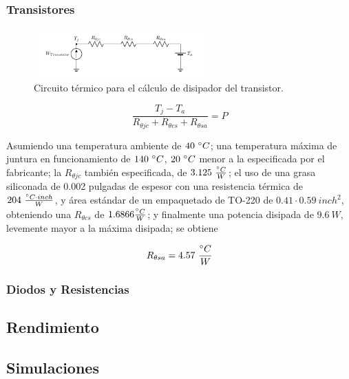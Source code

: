 \subsubsection{Transistores}

\begin{figure}[H]
\centering
	\includegraphics[width=0.6\textwidth, page=1]{ImagenesEjercicio2/Potencia.pdf}
	\caption{Circuito térmico para el cálculo de disipador del transistor.}
	\label{fig:circuitopottrans}
\end{figure}

\begin{equation}
\frac{T_j - T_a}{R_{\theta jc}+R_{\theta cs}+R_{\theta sa}} = P
\end{equation}

Asumiendo una temperatura ambiente de $40 \ \degree C$; una temperatura máxima de juntura en funcionamiento de $140 \ \degree C$, $20 \ \degree C$ menor a la especificada por el fabricante; la $R_{\theta jc}$ también especificada, de $3.125 \ \frac{\degree C}{W}$; el uso de una grasa siliconada de 0.002 pulgadas de espesor con una resistencia térmica de $204 \ \frac{\degree C \cdot inch}{W}$, y área estándar de un empaquetado de TO-220 de $0.41\cdot 0.59 \ inch^2$, obteniendo una $R_{\theta cs}$ de $1.6866 \frac{\degree C}{W}$; y finalmente una potencia disipada de $9.6 \ W$, levemente mayor a la máxima disipada; se obtiene

\begin{equation}
R_{\theta sa} = 4.57  \  \frac{\degree C}{W}
\end{equation}
\subsubsection{Diodos y Resistencias}


\subsection{Rendimiento}


\subsection{Simulaciones}
